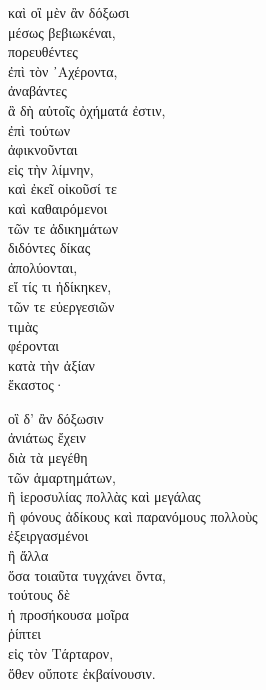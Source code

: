 {\large
\begin{greek}
\noindent καὶ οἳ μὲν ἂν δόξωσι \\
\tabto{2em} μέσως βεβιωκέναι, \\
πορευθέντες \\
\tabto{2em} ἐπὶ τὸν ᾿Αχέροντα, \\
ἀναβάντες \\
\tabto{2em} ἃ δὴ αὐτοῖς ὀχήματά ἐστιν, \\
ἐπὶ τούτων \\
ἀφικνοῦνται \\
\tabto{2em} εἰς τὴν λίμνην, \\
καὶ ἐκεῖ οἰκοῦσί τε \\
καὶ καθαιρόμενοι \\
\tabto{2em} τῶν τε ἀδικημάτων \\
\tabto{2em} διδόντες δίκας \\
\tabto{2em} ἀπολύονται, \\
\tabto{4em} εἴ τίς τι ἠδίκηκεν, \\
\tabto{2em} τῶν τε εὐεργεσιῶν \\
\tabto{2em} τιμὰς \\
\tabto{2em} φέρονται \\
\tabto{4em} κατὰ τὴν ἀξίαν \\
\tabto{2em} ἕκαστος·

\noindent οἳ δ' ἂν δόξωσιν \\
\tabto{2em} ἀνιάτως ἔχειν \\
\tabto{2em} διὰ τὰ μεγέθη \\
\tabto{4em} τῶν ἁμαρτημάτων, \\
\tabto{2em} ἢ ἱεροσυλίας πολλὰς καὶ μεγάλας \\
\tabto{2em} ἢ φόνους ἀδίκους καὶ παρανόμους πολλοὺς \\
\tabto{2em} ἐξειργασμένοι \\
\tabto{2em} ἢ ἄλλα \\
\tabto{4em} ὅσα τοιαῦτα τυγχάνει ὄντα,\\
τούτους δὲ \\
ἡ προσήκουσα μοῖρα \\
ῥίπτει \\
\tabto{2em} εἰς τὸν Τάρταρον,\\
\tabto{4em} ὅθεν οὔποτε ἐκβαίνουσιν. \\

\end{greek}
}

